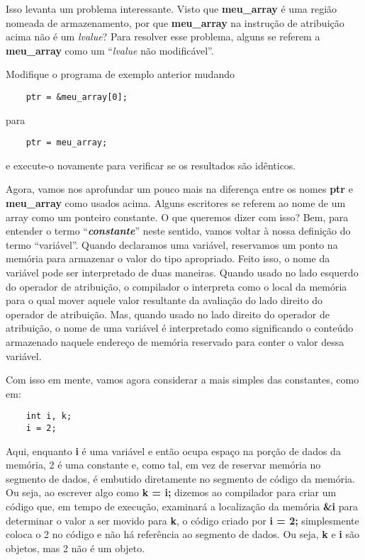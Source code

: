 Isso levanta um problema interessante. Visto que \textbf{meu\_array} é uma região nomeada de armazenamento, por que \textbf{meu\_array} na instrução de atribuição acima não é um \textit{lvalue}? Para resolver esse problema, alguns se referem a \textbf{meu\_array} como um ``\textit{lvalue} não modificável''.

Modifique o programa de exemplo anterior mudando
\begin{lstlisting}
	ptr = &meu_array[0];
\end{lstlisting}
para
\begin{lstlisting}
	ptr = meu_array;
\end{lstlisting}
e execute-o novamente para verificar se os resultados são idênticos.

Agora, vamos nos aprofundar um pouco mais na diferença entre os nomes \textbf{ptr} e \textbf{meu\_array} como usados acima. Alguns escritores se referem ao nome de um array como um ponteiro constante. O que queremos dizer com isso? Bem, para entender o termo ``\textbf{\textit{constante}}'' neste sentido, vamos voltar à nossa definição do termo ``variável''. Quando declaramos uma variável, reservamos um ponto na memória para armazenar o valor do tipo apropriado. Feito isso, o nome da variável pode ser interpretado de duas maneiras. Quando usado no lado esquerdo do operador de atribuição, o compilador o interpreta como o local da memória para o qual mover aquele valor resultante da avaliação do lado direito do operador de atribuição. Mas, quando usado no lado direito do operador de atribuição, o nome de uma variável é interpretado como significando o conteúdo armazenado naquele endereço de memória reservado para conter o valor dessa variável.

Com isso em mente, vamos agora considerar a mais simples das constantes, como em:
\begin{lstlisting}
	int i, k;
	i = 2;
\end{lstlisting}

Aqui, enquanto \textbf{i} é uma variável e então ocupa espaço na porção de dados da memória, 2 é uma constante e, como tal, em vez de reservar memória no segmento de dados, é embutido diretamente no segmento de código da memória. Ou seja, ao escrever algo como \textbf{k = i;} dizemos ao compilador para criar um código que, em tempo de execução, examinará a localização da memória \textbf{\&i} para determinar o valor a ser movido para \textbf{k}, o código criado por \textbf{i = 2;} simplesmente coloca o 2 no código e não há referência ao segmento de dados. Ou seja, \textbf{k} e \textbf{i} são objetos, mas 2 não é um objeto.

